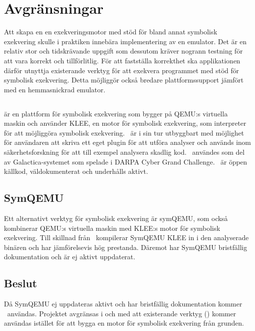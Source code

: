 \chapter{Avgränsningar}

Att skapa en en exekveringsmotor med stöd för bland annat symbolisk exekvering
skulle i praktiken innebära implementering av en emulator. Det är en relativ
stor och tidskrävande uppgift som dessutom kräver nogrann testning för att vara
korrekt och tillförlitlig. För att fastställa korrekthet ska applikationen
därför utnyttja existerande verktyg för att exekvera programmet med stöd för
symbolisk exekvering. Detta möjliggör också bredare plattformssupport jämfört
med en hemmasnickrad emulator.


\section{\stoe}

\stoe\cite{s2e} är en plattform för symbolisk exekvering som bygger på QEMU:s
virtuella maskin och använder KLEE\cite{klee}, en motor för symbolisk
exekvering, som interpreter för att möjliggöra symbolisk exekvering. \stoe\ är i
sin tur utbyggbart med möjlighet för användaren att skriva ett eget plugin för
att utföra analyser och används inom säkerhetsforskning för att till exempel
analysera skadlig kod. \stoe\ användes som del av Galactica-systemet som spelade
i DARPA Cyber Grand Challenge\cite{s2e_website}. \stoe\ är öppen källkod,
väldokumenterat och underhålls aktivt.

\section{SymQEMU}

Ett alternativt verktyg för symbolisk exekvering är symQEMU\cite{symqemu},
som också kombinerar QEMU:s virtuella maskin med KLEE:s motor för symbolisk
exekvering. Till skillnad från \stoe\ kompilerar SymQEMU KLEE in i den
analyserade binären och har jämförelsevis hög prestanda. Däremot har SymQEMU
bristfällig dokumentation och är ej aktivt uppdaterat.

\section{Beslut}

Då SymQEMU ej uppdateras aktivt och har bristfällig dokumentation kommer \stoe\
användas. Projektet avgränsas i och med att existerande verktyg (\stoe) kommer
användas istället för att bygga en motor för symbolisk exekvering från grunden.

